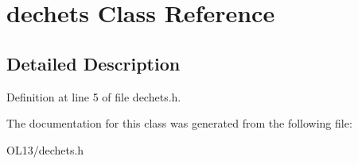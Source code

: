 \hypertarget{classdechets}{}\section{dechets Class Reference}
\label{classdechets}


\subsection{Detailed Description}


Definition at line 5 of file dechets.\+h.



The documentation for this class was generated from the following file\+:\begin{DoxyCompactItemize}
\item 
O\+L13/dechets.\+h\end{DoxyCompactItemize}
